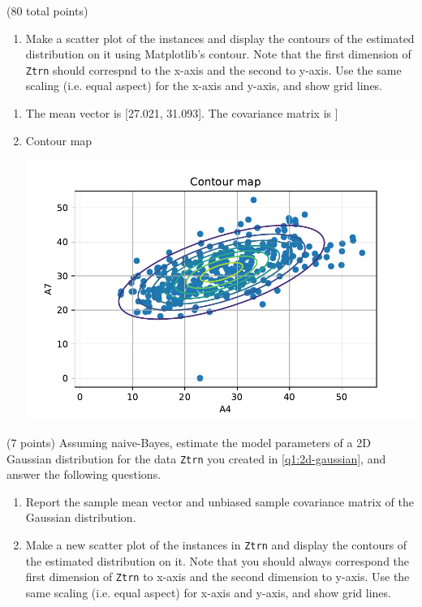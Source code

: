 \documentclass[12pt]{article}
\begin{document}
\begin{question}{(80 total points) \qOneTitle}
\begin{subquestion}
\begin{enumerate}
  \item Make a scatter plot of the instances and display the contours of the estimated distribution on it using Matplotlib's contour.
    Note that the first dimension of {\tt Ztrn} should correspnd to the x-axis
    and the second to y-axis. Use the same scaling (i.e. equal aspect) for the x-axis and y-axis, and show grid lines.
  \end{enumerate}
   

  \begin{answerbox}{0.6\textheight}
    \begin{enumerate}
    \item The mean vector is [27.021, 31.093]. 
    \newline The covariance matrix is 
    \newline [[95.141, 41.470] \newline [41.470, 46.693]]
    \item Contour map
        \begin{center}
         \includegraphics[scale=1.0]{Contour.pdf}
        \end{center}
    \end{enumerate}
  \end{answerbox}
  


\end{subquestion}

\begin{subquestion}{(7 points)
    Assuming naive-Bayes, estimate the model parameters of a 2D Gaussian distribution for the data {\tt Ztrn} you created in \ref{q1:2d-gaussian}, and answer the following questions.
  } \label{q1:2d-gaussina:nv}
  \begin{enumerate}\NARROWITEM
  \item Report the sample mean vector and unbiased sample covariance matrix of the Gaussian distribution. 
  \item Make a new scatter plot of the instances in {\tt Ztrn} and display the contours of the estimated distribution on it.
    Note that you should always correspond the first dimension of {\tt Ztrn} to x-axis and the second dimension to y-axis. Use the same scaling (i.e. equal aspect) for x-axis and y-axis, and show grid lines.


\end{enumerate}
\end{subquestion}
\end{question}
\end{document}
